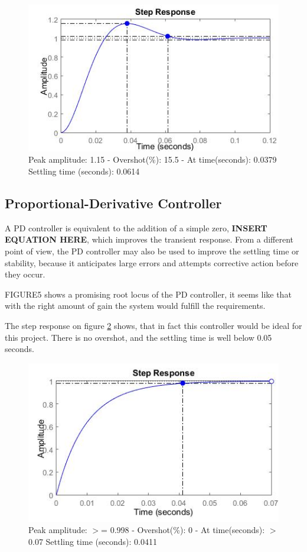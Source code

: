 \begin{figure}[h!]
\centering
\includegraphics[scale=0.7]{Billeder/PIStep.jpg}
\caption{ Peak amplitude: 1.15 - Overshot(\%): 15.5 - At time(seconds): 0.0379
		 Settling time (seconds): 0.0614 }
\label{fig:PIStep}
\end{figure}

\subsection{Proportional-Derivative Controller}

A PD controller is equivalent to the addition of a simple zero, \textbf{INSERT EQUATION HERE}, which improves the transient response. From a different point of view, the PD controller may also be used to improve the settling time or stability, because it anticipates large errors and attempts corrective action before they occur. 

FIGURE5 shows a promising root locus of the PD controller, it seems like that with the right amount of gain the system would fulfill the requirements.

The step response on figure \ref{fig:PDStep} shows, that in fact this controller would be ideal for this project. There is no overshot, and the settling time is well below 0.05 seconds.

\begin{figure}[h!]
\centering
\includegraphics[scale=0.7]{Billeder/PDStep.jpg}
\caption{ Peak amplitude: $>$= 0.998 - Overshot(\%): 0 - At time(seconds): $>$ 0.07
		 Settling time (seconds): 0.0411 }
\label{fig:PDStep}
\end{figure}

